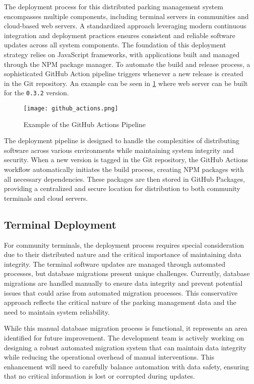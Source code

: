 The deployment process for this distributed parking management system encompasses multiple components, including terminal servers in communities and cloud-based web servers. A standardized approach leveraging modern continuous integration and deployment practices ensures consistent and reliable software updates across all system components. The foundation of this deployment strategy relies on JavaScript frameworks, with applications built and managed through the NPM package manager. To automate the build and release process, a sophisticated GitHub Action pipeline triggers whenever a new release is created in the Git repository. An example can be seen in \cref{fig:github_actions} where web server can be built for the \texttt{0.3.2} version.

\begin{figure}
	\texttt{[image: github\_actions.png]}
	\caption{Example of the GitHub Actions Pipeline}\label{fig:github_actions}
\end{figure}

The deployment pipeline is designed to handle the complexities of distributing software across various environments while maintaining system integrity and security. When a new version is tagged in the Git repository, the GitHub Actions workflow automatically initiates the build process, creating NPM packages with all necessary dependencies. These packages are then stored in GitHub Packages, providing a centralized and secure location for distribution to both community terminals and cloud servers.

\subsection{Terminal Deployment}

For community terminals, the deployment process requires special consideration due to their distributed nature and the critical importance of maintaining data integrity. The terminal software updates are managed through automated processes, but database migrations present unique challenges. Currently, database migrations are handled manually to ensure data integrity and prevent potential issues that could arise from automated migration processes. This conservative approach reflects the critical nature of the parking management data and the need to maintain system reliability.

While this manual database migration process is functional, it represents an area identified for future improvement. The development team is actively working on designing a robust automated migration system that can maintain data integrity while reducing the operational overhead of manual interventions. This enhancement will need to carefully balance automation with data safety, ensuring that no critical information is lost or corrupted during updates.

